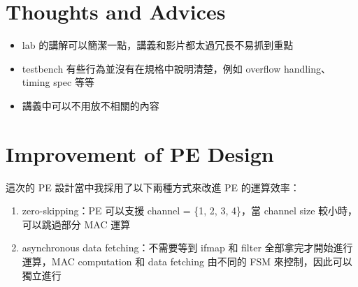\documentclass[12pt]{article}
\begin{document}
\pagebreak

\section{Thoughts and Advices}

\begin{itemize}
    \item lab 的講解可以簡潔一點，講義和影片都太過冗長不易抓到重點
    \item testbench 有些行為並沒有在規格中說明清楚，例如 overflow handling、timing spec 等等
    \item 講義中可以不用放不相關的內容
\end{itemize}

\section{Improvement of PE Design}

這次的 PE 設計當中我採用了以下兩種方式來改進 PE 的運算效率：
\begin{enumerate}
    \item zero-skipping：PE 可以支援 channel = \{1, 2, 3, 4\}，當 channel size 較小時，可以跳過部分 MAC 運算
    \item asynchronous data fetching：不需要等到 ifmap 和 filter 全部拿完才開始進行運算，MAC computation 和 data fetching 由不同的 FSM 來控制，因此可以獨立進行
\end{enumerate}

\end{document}
